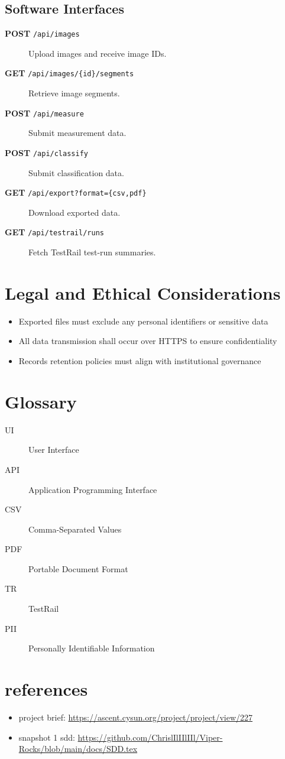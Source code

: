 \documentclass{article}
\begin{document}
\subsection{Software Interfaces}
\begin{description}
  \item[\textbf{POST} \texttt{/api/images}]  
    Upload images and receive image IDs.
  \item[\textbf{GET} \texttt{/api/images/\{id\}/segments}]  
    Retrieve image segments.
  \item[\textbf{POST} \texttt{/api/measure}]  
    Submit measurement data.
  \item[\textbf{POST} \texttt{/api/classify}]  
    Submit classification data.
  \item[\textbf{GET} \texttt{/api/export?format=\{csv,pdf\}}]  
    Download exported data.
  \item[\textbf{GET} \texttt{/api/testrail/runs}]  
    Fetch TestRail test-run summaries.
\end{description}


\section{Legal and Ethical Considerations}
\begin{itemize}
  \item Exported files must exclude any personal identifiers or sensitive data
  \item All data transmission shall occur over HTTPS to ensure confidentiality
  \item Records retention policies must align with institutional governance
\end{itemize}

\section{Glossary}
\begin{description}
  \item[UI] User Interface
  \item[API] Application Programming Interface
  \item[CSV] Comma-Separated Values
  \item[PDF] Portable Document Format
  \item[TR] TestRail
  \item[PII] Personally Identifiable Information
\end{description}

\section{references}
\begin{itemize}
\item project brief: \url{https://ascent.cysun.org/project/project/view/227}
\item snapshot 1 sdd: \url{https://github.com/ChrislIlIIlIIl/Viper-Rocks/blob/main/docs/SDD.tex}
\end{itemize}
\end{document}
